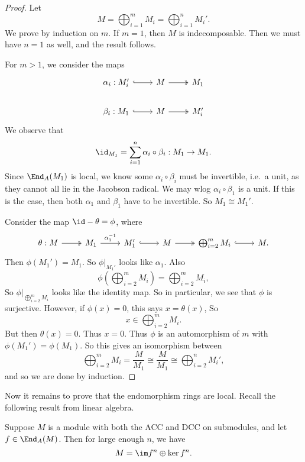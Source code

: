\documentclass[a4paper]{article}
\begin{document}
\begin{proof} %
  Let
  \[
    M = \bigoplus_{i = 1}^m M_i = \bigoplus_{i = 1}^n M_i'.
  \]
  We prove by induction on $m$. If $m = 1$, then $M$ is indecomposable. Then we must have $n = 1$ as well, and the result follows.

  For $m > 1$, we consider the maps
  \[
    \begin{tikzcd}
      \alpha_i: M_i' \ar[r, hook] & M \ar[r, two heads] & M_1\\
      \beta_i: M_1 \ar[r, hook] & M \ar[r, two heads] & M_i'
    \end{tikzcd}
  \]
  We observe that
  \[
    \id_{M_1} = \sum_{i = 1}^n \alpha_i \circ \beta_i: M_1 \to M_1.
  \]
  Since $\End_A(M_1)$ is local, we know some $\alpha_i \circ \beta_i$ must be invertible, i.e.\ a unit, as they cannot all lie in the Jacobson radical. We may wlog $\alpha_i \circ \beta_1$ is a unit. If this is the case, then both $\alpha_1$ and $\beta_1$ have to be invertible. So $M_1 \cong M_1'$. %

  Consider the map $\id - \theta = \phi$, where
  \[
    \begin{tikzcd}
      \theta: M \ar[r, two heads] & M_1 \ar[r, "\alpha_1^{-1}"] & M_1' \ar[r, hook] & M \ar[r, two heads] & \bigoplus_{i = 2}^m M_i \ar[r, hook] & M.
    \end{tikzcd}
  \]
  Then $\phi(M_1') = M_1$. So $\phi|_{M_1'}$ looks like $\alpha_1$. Also
  \[
    \phi\left(\bigoplus_{i = 2}^m M_i\right) = \bigoplus_{i = 2}^m M_i,
  \]
  So $\phi|_{\bigoplus_{i = 2}^m M_i}$ looks like the identity map. So in particular, we see that $\phi$ is surjective. However, if $\phi(x) = 0$, this says $x = \theta(x)$, So
  \[
    x \in \bigoplus_{i = 2}^m M_i.
  \]
  But then $\theta(x) = 0$. Thus $x = 0$. Thus $\phi$ is an automorphism of $m$ with $\phi(M_1') = \phi(M_1)$. So this gives an isomorphism between
  \[
    \bigoplus_{i = 2}^m M_i = \frac{M}{M_1} \cong \frac{M}{M_1} \cong \bigoplus_{i = 2}^n M_i',
  \]
  and so we are done by induction.
\end{proof}

Now it remains to prove that the endomorphism rings are local. Recall the following result from linear algebra.
\begin{lemma}[Fitting]
  Suppose $M$ is a module with both the ACC and DCC on submodules, and let $f \in \End_A(M)$. Then for large enough $n$, we have
  \[
    M = \im f^n \oplus \ker f^n.
  \]
\end{lemma}
\end{document}
